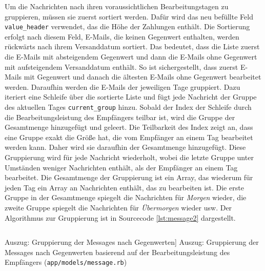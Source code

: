 \noindent Um die Nachrichten nach ihren voraussichtlichen Bearbeitungstagen zu gruppieren, müssen sie zuerst sortiert werden. Dafür wird das neu befüllte Feld \texttt{value\_header} verwendet, das die Höhe der Zahlungen enthält. Die Sortierung erfolgt nach diesem Feld, E-Mails, die keinen Gegenwert enthalten, werden rückwärts nach ihrem Versanddatum sortiert. Das bedeutet, dass die Liste zuerst die E-Mails mit absteigendem Gegenwert und dann die E-Mails ohne Gegenwert mit aufsteigendem Versanddatum enthält. So ist sichergestellt, dass zuerst E-Mails mit Gegenwert und danach die ältesten E-Mails ohne Gegenwert bearbeitet werden. Daraufhin werden die E-Mails der jeweiligen Tage gruppiert. Dazu iteriert eine Schleife über die sortierte Liste und fügt jede Nachricht der Gruppe des aktuellen Tages \texttt{current\_group} hinzu. Sobald der Index der Schleife durch die Bearbeitungsleistung des Empfängers teilbar ist, wird die Gruppe der Gesamtmenge hinzugefügt und geleert. Die Teilbarkeit des Index zeigt an, dass eine Gruppe exakt die Größe hat, die vom Empfänger an einem Tag bearbeitet werden kann. Daher wird sie daraufhin der Gesamtmenge hinzugefügt. Diese Gruppierung wird für jede Nachricht wiederholt, wobei die letzte Gruppe unter Umständen weniger Nachrichten enthält, als der Empfänger an einem Tag bearbeitet. Die Gesamtmenge der Gruppierung ist ein Array, das wiederum für jeden Tag ein Array an Nachrichten enthält, das zu bearbeiten ist. Die erste Gruppe in der Gesamtmenge spiegelt die Nachrichten für \textit{Morgen} wieder, die zweite Gruppe spiegelt die Nachrichten für \textit{Übermorgen} wieder usw. Der Algorithmus zur Gruppierung ist in Sourcecode \ref{lst:message2} dargestellt.

\begin{listing}[!ht]
\inputminted[firstline=22, lastline=38,linenos]{ruby}{Listings/Pkg2/message.rb}

\caption
    [Auszug: Gruppierung der Messages nach Gegenwerten]
    {Auszug: Gruppierung der Messages nach Gegenwerten basierend auf der Bearbeitungsleistung des Empfängers (\texttt{app/models/message.rb})}

\label{lst:message2}
\end{listing}

